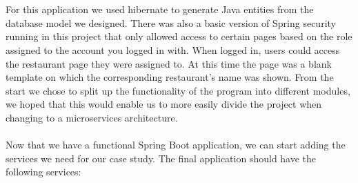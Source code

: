\documentclass[12pt]{article}
\begin{document}
\begin{multicols}{2}
\\\\
For this application we used hibernate to generate Java entities from the database model we designed. There was also a basic version of Spring security running in this project that only allowed access to certain pages based on the role assigned to the account you logged in with. When logged in, users could access the restaurant page they were assigned to. At this time the page was a blank template on which the corresponding restaurant's name was shown. From the start we chose to split up the functionality of the program into different modules, we hoped that this would enable us to more easily divide the project when changing to a microservices architecture.
\\\\
Now that we have a functional Spring Boot application, we can start adding the services we need for our case study. The final application should have the following services:


\end{multicols}
\end{document}
